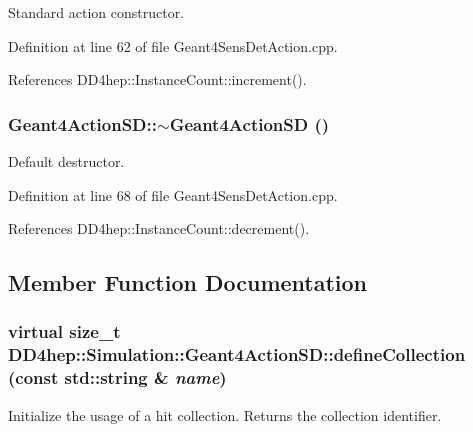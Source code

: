 Standard action constructor. 

Definition at line 62 of file Geant4SensDetAction.cpp.

References DD4hep::InstanceCount::increment().\hypertarget{class_d_d4hep_1_1_simulation_1_1_geant4_action_s_d_a535bbf839314d7cdaf37c42712ea96b6}{
\subsubsection[{$\sim$Geant4ActionSD}]{\setlength{\rightskip}{0pt plus 5cm}Geant4ActionSD::$\sim$Geant4ActionSD ()}}
\label{class_d_d4hep_1_1_simulation_1_1_geant4_action_s_d_a535bbf839314d7cdaf37c42712ea96b6}


Default destructor. 

Definition at line 68 of file Geant4SensDetAction.cpp.

References DD4hep::InstanceCount::decrement().

\subsection{Member Function Documentation}
\hypertarget{class_d_d4hep_1_1_simulation_1_1_geant4_action_s_d_acb227bd17a6f30d5df564a4d19f3f8a2}{
\subsubsection[{defineCollection}]{\setlength{\rightskip}{0pt plus 5cm}virtual size\_\-t DD4hep::Simulation::Geant4ActionSD::defineCollection (const std::string \& {\em name})}}
\label{class_d_d4hep_1_1_simulation_1_1_geant4_action_s_d_acb227bd17a6f30d5df564a4d19f3f8a2}


Initialize the usage of a hit collection. Returns the collection identifier. 

